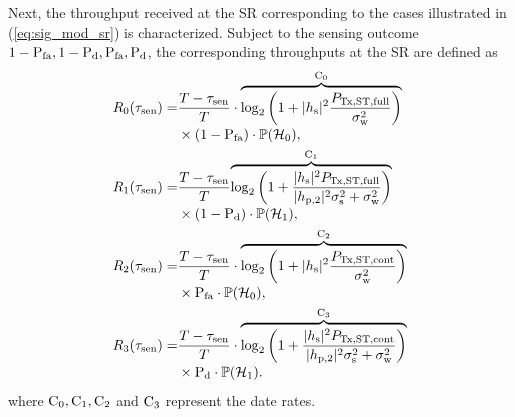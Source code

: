 Next, the throughput received at the SR corresponding to the cases illustrated in (\ref{eq:sig_mod_sr}) is characterized. Subject to the sensing outcome $1 - \text{P}_{\text{fa}}, 1 - \text{P}_{\text{d}}, \text{P}_{\text{fa}}, \text{P}_{\text{d}}$, the corresponding throughputs at the SR are defined as 
\begin{align}
\rsz(\tsen) =& \frac{T- \tsen}{T} \cdot \smash[b]{\overbrace{\log_2 \left(1 + |\hs|^2 \frac{\pfull}{\npo}\right)}^{\cz}} \nonumber \\ 
\quad & \times (1 - \pfa ) \cdot \phz,  \label{eq:Cap0} \\ 
\rso(\tsen) =& \frac{T- \tsen}{T} \smash[b]{\overbrace{\log_2 \left(1 + \frac{|\hs|^2 \pfull }{|\hptw|^2 \ptranpt  + \npo} \right)}^{\co}} \nonumber \\ 
\quad & \times (1 - \pd) \cdot \pho,  \label{eq:Cap1} \\ 
\rstw(\tsen) =& \frac{T- \tsen}{T} \cdot \smash[b]{\overbrace{\log_2 \left(1 + |\hs|^2 \frac{\preg}{\npo}\right)}^{\ctw}} \nonumber \\ 
\quad & \times \pfa \cdot \phz,  \label{eq:Cap2} \\ 
\rsth(\tsen) =& \frac{T- \tsen}{T} \cdot \smash[b]{\overbrace{\log_2 \left(1 + \frac{|\hs|^2 \preg }{|\hptw|^2 \ptranpt  + \npo} \right)}^{\cth}}  \nonumber \\   
\quad & \times \pd \cdot \pho.  \label{eq:Cap3}  
\end{align}
where $\text{C}_0, \text{C}_1, \text{C}_2$ and $\text{C}_3$ represent the date rates.

